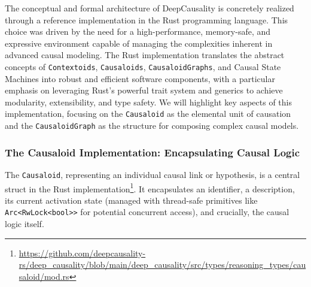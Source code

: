 The conceptual and formal architecture of DeepCausality is concretely realized through a reference implementation in the Rust programming language. This choice was driven by the need for a high-performance, memory-safe, and expressive environment capable of managing the complexities inherent in advanced causal modeling. The Rust implementation translates the abstract concepts of \texttt{Contextoids}, \texttt{Causaloids}, \texttt{CausaloidGraphs}, and Causal State Machines into robust and efficient software components, with a particular emphasis on leveraging Rust's powerful trait system and generics to achieve modularity, extensibility, and type safety. We will highlight key aspects of this implementation, focusing on the \texttt{Causaloid} as the elemental unit of causation and the \texttt{CausaloidGraph} as the structure for composing complex causal models.

\subsubsection{The Causaloid Implementation: Encapsulating Causal Logic}
\label{subsubsec:causaloid_implementation}

The \texttt{Causaloid}, representing an individual causal link or hypothesis, is a central struct in the Rust implementation\footnote{\url{https://github.com/deepcausality-rs/deep_causality/blob/main/deep_causality/src/types/reasoning_types/causaloid/mod.rs}}. It encapsulates an identifier, a description, its current activation state (managed with thread-safe primitives like \texttt{Arc<RwLock<bool>>} for potential concurrent access), and crucially, the causal logic itself.

